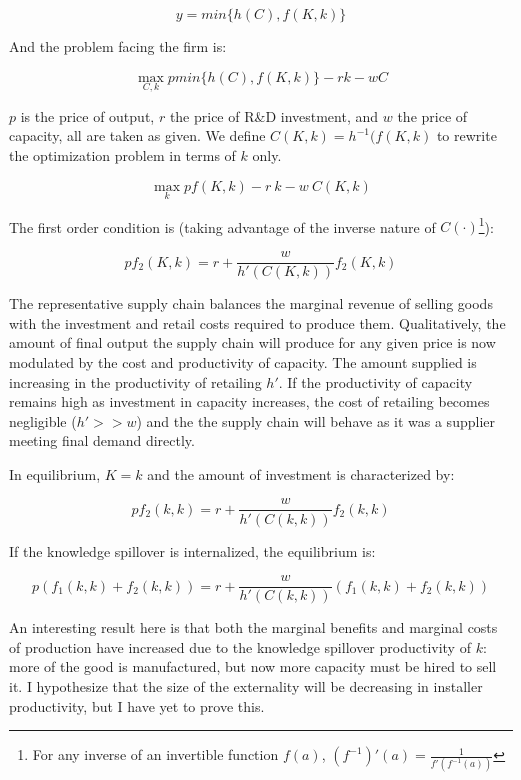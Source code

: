 \documentclass{article}
\begin{document}
\[
y = min\{h(C), f(K,k)\}
\]

And the problem facing the firm is:

\[
\max_{C,k} p min\{h(C), f(K,k)\} - r k - w C
\]

$p$ is the price of output, $r$ the price of R\&D investment, and $w$ the price of capacity, all are taken as given. We define $C(K,k) = h^{-1} (f(K,k)$ to rewrite the optimization problem in terms of $k$ only.

\begin{equation}
\max_{k} p f(K,k) - r\:k - w\:C(K,k)
\end{equation}

The first order condition is (taking advantage of the inverse nature of $C(\cdot)$\footnote{ For any inverse of an invertible function $f(a)$, $(f^{-1})'(a) = \frac{1}{f'(f^{-1}(a))}$}):

\[
p f_2(K,k) = r + \frac{w}{h'(C(K,k))} f_2 (K,k)
\]

The representative supply chain balances the marginal revenue of selling goods with the investment and retail costs required to produce them. Qualitatively, the amount of final output the supply chain will produce for any given price is now modulated by the cost and productivity of capacity. The amount supplied is increasing in the productivity of retailing $h'$. If the productivity of capacity remains high as investment in capacity increases, the cost of retailing becomes negligible (\(h' >> w\)) and the the supply chain will behave as it was a supplier meeting final demand directly.

 In equilibrium, $K=k$ and the amount of investment is characterized by:

\begin{equation}
p f_2(k,k) = r + \frac{w}{h'(C(k,k))} f_2 (k,k)
\label{eq_FOC}
\end{equation}

If the knowledge spillover is internalized, the equilibrium is:

\begin{equation}
p ( f_1(k,k) + f_2(k,k)) = r + \frac{w}{h'(C(k,k))} ( f_1(k,k) + f_2 (k,k))
\end{equation}

An interesting result here is that both the marginal benefits and marginal costs of production have increased due to the knowledge spillover productivity of $k$: more of the good is manufactured, but now more capacity must be hired to sell it. I hypothesize that the size of the externality will be decreasing in installer productivity, but I have yet to prove this.
\end{document}
